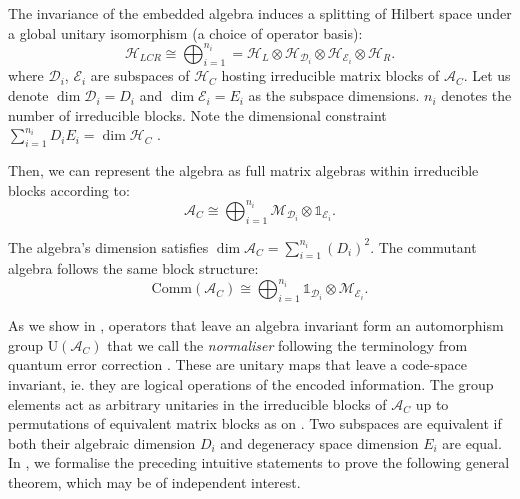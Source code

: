 \documentclass[11pt, twocolumn, floatfix, superscriptaddress, aps, prb, raggedbottom]{revtex4-2}
\newcommand{\comm}{\mathrm{Comm}}
\newcommand{\Id}{\mathds{1}}
\begin{document}
The invariance of the embedded algebra induces a splitting of Hilbert space under a global unitary isomorphism (a choice of operator basis): 
\begin{equation}
    \mathcal{H}_{LCR} \cong \bigoplus_{i=1}^{n_i} = \mathcal
    {H}_L\otimes\mathcal{H}_{
    \mathcal{D}_i} \otimes \mathcal{H}_{\mathcal{E}_i} \otimes \mathcal{H}_R.
\end{equation}
where $\mathcal{D}_i$, $\mathcal{E}_i$ are subspaces of $\mathcal{H}_C$ hosting irreducible matrix blocks of $\mathcal{A}_C$. Let us denote $\dim \mathcal{D}_i = D_i$ and $\dim \mathcal{E}_i = E_i$ as the subspace dimensions. $n_i$ denotes the number of irreducible blocks. Note the dimensional constraint $\sum_{i=1}^{n_i} {D}_i{E}_i = \dim \mathcal{H}_C$ .

Then, we can represent the algebra as full matrix algebras within irreducible blocks according to:
\begin{equation}
    \mathcal{A}_C \cong \bigoplus_{i=1}^{n_i} \mathcal{M}_{\mathcal{D}_i} \otimes \Id_{\mathcal{E}_i}.
    \label{thm:block_structure}
\end{equation}

\noindent The algebra's dimension satisfies $\dim \mathcal{A}_C = \sum_{i=1}^{n_i}( {D}_i)^2$. The commutant algebra follows the same block structure:
\begin{equation}
    \comm(\mathcal{A}_C) \cong \bigoplus_{i=1}^{n_i} \Id _{\mathcal{D}_i} \otimes \mathcal{M}_{\mathcal{E}_i}.
\end{equation}

As we show in , operators that leave an algebra invariant form an automorphism group $\mathrm{U}\left ({{\mathcal{A}_C}} \right)$ that we call the \textit{normaliser} following the terminology from quantum error correction \cite{kribs2006operatorquantumerrorcorrection}. These are unitary maps that leave a code-space invariant, ie. they are logical operations of the encoded information. The group elements act as arbitrary unitaries in the irreducible blocks of $\mathcal{A}_C$ up to permutations of equivalent matrix blocks as on . Two subspaces are equivalent if both their algebraic dimension $D_i$ and degeneracy space dimension $E_i$ are equal. In , we formalise the preceding intuitive statements to prove the following general theorem, which may be of independent interest.
\end{document}

